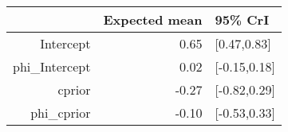 \begin{tabular}{rrl}
  \hline
 & Expected mean & 95\% CrI \\ 
  \hline
Intercept & 0.65 & [0.47,0.83] \\ 
  phi\_Intercept & 0.02 & [-0.15,0.18] \\ 
  cprior & -0.27 & [-0.82,0.29] \\ 
  phi\_cprior & -0.10 & [-0.53,0.33] \\ 
   \hline
\end{tabular}


